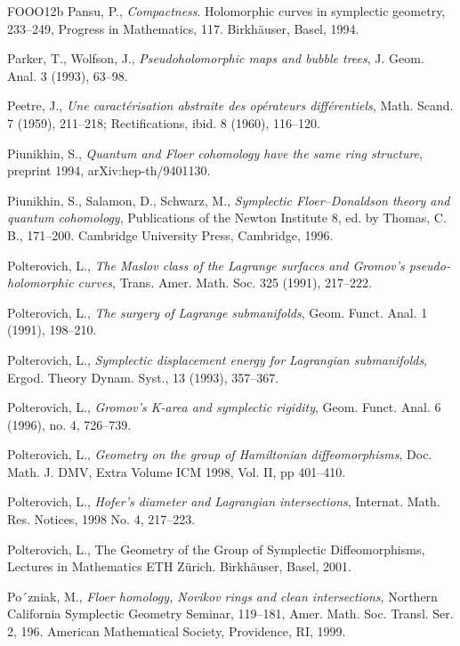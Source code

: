 \begin{thebibliography}{FOOO12b}
 Pansu, P., \emph{Compactness}. Holomorphic curves in symplectic geometry, 233–249,
  Progress in Mathematics, 117. Birkhäuser, Basel, 1994.

 Parker, T., Wolfson, J., \emph{Pseudoholomorphic maps and bubble trees}, J. Geom.
  Anal. 3 (1993), 63–98.

 Peetre, J., \emph{Une caractérisation abstraite des opérateurs diﬀérentiels}, Math.
  Scand. 7 (1959), 211–218; Rectifications, ibid. 8 (1960), 116–120.

 Piunikhin, S., \emph{Quantum and Floer cohomology have the same ring structure},
  preprint 1994, arXiv:hep-th/9401130.

 Piunikhin, S., Salamon, D., Schwarz, M., \emph{Symplectic Floer–Donaldson theory
  and quantum cohomology}, Publications of the Newton Insti\-tute 8, ed. by Thomas, C. B., 171–200.
  Cambridge University Press, Cambridge, 1996.

 Polterovich, L., \emph{The Maslov class of the Lagrange surfaces and Gro\-mov’s
  pseudo-holomorphic curves}, Trans. Amer. Math. Soc. 325 (1991), 217–222.

 Polterovich, L., \emph{The surgery of Lagrange submanifolds}, Geom. Funct. Anal. 1
  (1991), 198–210.

 Polterovich, L., \emph{Symplectic displacement energy for Lagrangian
  subman\-ifolds}, Ergod. Theory Dynam. Syst., 13 (1993), 357–367.

 Polterovich, L., \emph{Gromov’s K-area and symplectic rigidity}, Geom. Funct. Anal.
  6 (1996), no. 4, 726–739.

 Polterovich, L., \emph{Geometry on the group of Hamiltonian diﬀeomorphisms}, Doc.
  Math. J. DMV, Extra Volume ICM 1998, Vol. II, pp 401–410.

 Polterovich, L., \emph{Hofer’s diameter and Lagrangian intersections}, Internat.
  Math. Res. Notices, 1998 No. 4, 217–223.

 Polterovich, L., The Geometry of the Group of Symplectic Diﬀeo\-morphisms, Lectures
  in Mathematics ETH Zürich. Birkhäuser, Basel, 2001.

 Po´zniak, M., \emph{Floer homology, Novikov rings and clean intersections},
  Northern California Symplectic Geometry Seminar, 119–181, Amer. Math. Soc. Transl. Ser. 2, 196.
  American Mathematical Society, Prov\-idence, RI, 1999.


\end{thebibliography}
